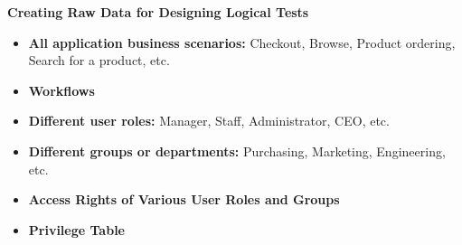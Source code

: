 	{\bf Creating Raw Data for Designing Logical Tests} \\
		\begin{itemize}
			\item {\bf All application business scenarios:} Checkout, Browse, Product ordering, Search for a 
			product, etc.
			\item {\bf Workflows}
			\item {\bf Different user roles:} Manager, Staff, Administrator, CEO, etc.
			\item {\bf Different groups or departments:} Purchasing, Marketing, Engineering, etc.
			\item {\bf Access Rights of Various User Roles and Groups}
			\item {\bf Privilege Table}
		\end{itemize}



